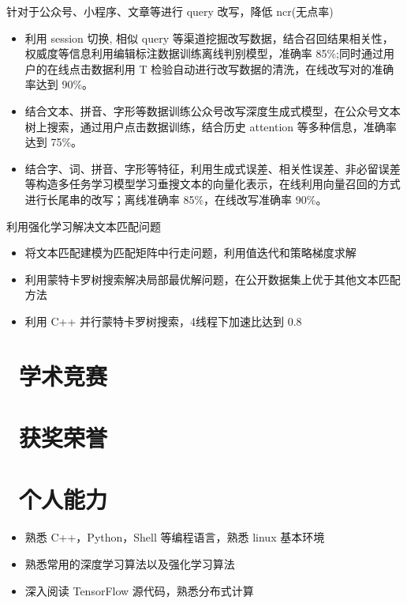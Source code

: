 \documentclass{resume}
\begin{document}
\begin{onehalfspacing}
针对于公众号、小程序、文章等进行 query 改写，降低 ncr(无点率)
\begin{itemize}
  \item 利用 session 切换, 相似 query 等渠道挖掘改写数据，结合召回结果相关性，权威度等信息利用编辑标注数据训练离线判别模型，准确率 85\%;同时通过用户的在线点击数据利用 T 检验自动进行改写数据的清洗，在线改写对的准确率达到 90\%。
  \item 结合文本、拼音、字形等数据训练公众号改写深度生成式模型，在公众号文本树上搜索，通过用户点击数据训练，结合历史 attention 等多种信息，准确率达到 75\%。
  \item 结合字、词、拼音、字形等特征，利用生成式误差、相关性误差、非必留误差等构造多任务学习模型学习垂搜文本的向量化表示，在线利用向量召回的方式进行长尾串的改写；离线准确率 85\%，在线改写准确率 90\%。
\end{itemize}
\end{onehalfspacing}


\begin{onehalfspacing}
利用强化学习解决文本匹配问题
\begin{itemize}
  \item 将文本匹配建模为匹配矩阵中行走问题，利用值迭代和策略梯度求解
  \item 利用蒙特卡罗树搜索解决局部最优解问题，在公开数据集上优于其他文本匹配方法
  \item 利用 C++ 并行蒙特卡罗树搜索，4线程下加速比达到 0.8
\end{itemize}
\end{onehalfspacing}

\section{\faTrophy\ 学术竞赛}

\section{\faHeartO\ 获奖荣誉}

\section{\faCogs\ 个人能力}
\begin{itemize}[parsep=0.5ex]
  \item 熟悉 C++，Python，Shell 等编程语言，熟悉 linux 基本环境
  \item 熟悉常用的深度学习算法以及强化学习算法
  \item 深入阅读 TensorFlow 源代码，熟悉分布式计算
\end{itemize}
\end{document}
